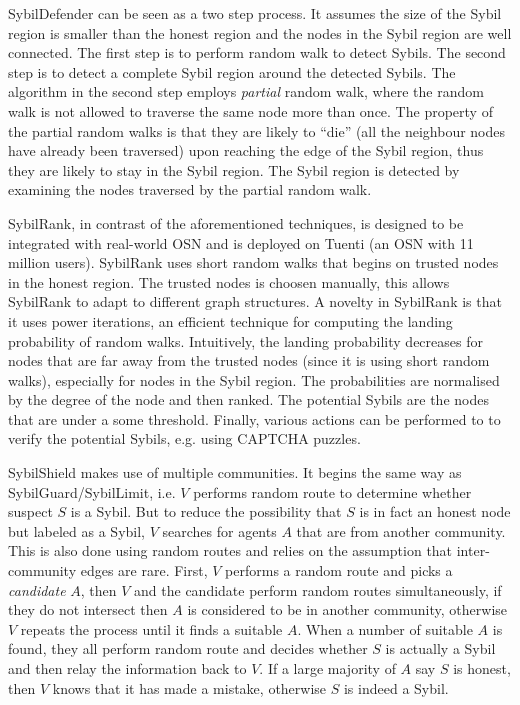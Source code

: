 SybilDefender\cite{wei2012sybildefender} can be seen as a two step process. It
assumes the size of the Sybil region is smaller than the honest region and the
nodes in the Sybil region are well connected. The first step is to perform
random walk to detect Sybils. The second step is to detect a complete Sybil
region around the detected Sybils. The algorithm in the second step employs
\emph{partial} random walk, where the random walk is not allowed to traverse the
same node more than once. The property of the partial random walks is that they
are likely to ``die'' (all the neighbour nodes have already been traversed) upon
reaching the edge of the Sybil region, thus they are likely to stay in the Sybil
region. The Sybil region is detected by examining the nodes traversed by the
partial random walk.


SybilRank, in contrast of the aforementioned techniques, is designed to be
integrated with real-world OSN and is deployed on Tuenti (an OSN with 11 million
users)\cite{cao2012aiding}. SybilRank uses short random walks that begins on
trusted nodes in the honest region. The trusted nodes is choosen manually, this
allows SybilRank to adapt to different graph structures. A novelty in SybilRank
is that it uses power iterations, an efficient technique for computing the
landing probability of random walks. Intuitively, the landing probability
decreases for nodes that are far away from the trusted nodes (since it is using
short random walks), especially for nodes in the Sybil region. The probabilities
are normalised by the degree of the node and then ranked. The potential Sybils
are the nodes that are under a some threshold. Finally, various actions can be
performed to to verify the potential Sybils, e.g. using CAPTCHA puzzles.

SybilShield\cite{shi2013sybilshield} makes use of multiple communities. It
begins the same way as SybilGuard/SybilLimit, i.e. $V$ performs random route to
determine whether suspect $S$ is a Sybil. But to reduce the possibility that $S$
is in fact an honest node but labeled as a Sybil, $V$ searches for agents $A$
that are from another community. This is also done using random routes and
relies on the assumption that inter-community edges are rare. First, $V$
performs a random route and picks a \emph{candidate} $A$, then $V$ and the
candidate perform random routes simultaneously, if they do not intersect then
$A$ is considered to be in another community, otherwise $V$ repeats the process
until it finds a suitable $A$. When a number of suitable $A$ is found, they all
perform random route and decides whether $S$ is actually a Sybil and then relay
the information back to $V$. If a large majority of $A$ say $S$ is honest, then
$V$ knows that it has made a mistake, otherwise $S$ is indeed a Sybil.

